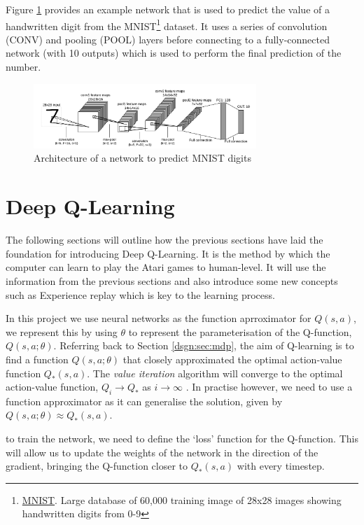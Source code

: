 Figure \ref{fig:mnist-arch} provides an example network that is used to predict the value of a handwritten digit from the MNIST\footnote{\href{http://yann.lecun.com/exdb/mnist/}{MNIST}. Large database of 60,000 training image of 28x28 images showing handwritten digits from 0-9} dataset. It uses a series of convolution (CONV) and pooling (POOL) layers before connecting to a fully-connected network (with 10 outputs) which is used to perform the final prediction of the number.

\begin{figure}[htbp]
	\centering
	\includegraphics[width=0.75\textwidth]{chapters/chapter3/images/mnist.png}
	\caption{Architecture of a network to predict MNIST digits
		\label{fig:mnist-arch}
	}
\end{figure}

\section{Deep Q-Learning}
\label{dsgn:sec:dql}
The following sections will outline how the previous sections have laid the foundation for introducing Deep Q-Learning. It is the method by which the computer can learn to play the Atari games to human-level. It will use the information from the previous sections and also introduce some new concepts such as Experience replay which is key to the learning process.

In this project we use neural networks as the function aprroximator for $Q(s, a)$, we represent this by using $\theta$ to represent the parameterisation of the Q-function, $Q(s, a; \theta)$. Referring back to Section \ref{dsgn:sec:mdp}, the aim of Q-learning is to find a function $Q(s, a; \theta)$ that closely approximated the optimal action-value function $Q_*(s, a)$.
The \textit{value iteration} algorithm will converge to the optimal action-value function, $Q_i \rightarrow Q_*$ as $i \rightarrow \infty$ \cite{richardsutton2018}. In practise however, we need to use a function approximator as it can generalise the solution, given by $Q(s, a; \theta) \approx Q_*(s, a)$.

to train the network, we need to define the `loss' function for the Q-function. This will allow us to update the weights of the network in the direction of the gradient, bringing the Q-function closer to $Q_*(s, a)$ with every timestep.

